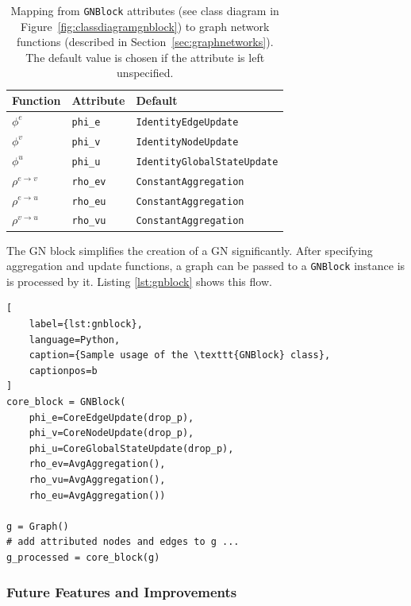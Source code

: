 \begin{table}
    \centering
    \begin{tabular}{ l l l }
        \hline
        \textbf{Function} & \textbf{Attribute} & \textbf{Default}\\
        \hline
        $\phi^e$ & \texttt{phi\_e} & \texttt{IdentityEdgeUpdate} \\
        $\phi^v$ & \texttt{phi\_v} & \texttt{IdentityNodeUpdate} \\
        $\phi^u$ & \texttt{phi\_u} & \texttt{IdentityGlobalStateUpdate} \\
        $\rho^{e\rightarrow v}$ & \texttt{rho\_ev} & \texttt{ConstantAggregation} \\
        $\rho^{e\rightarrow u}$ & \texttt{rho\_eu} & \texttt{ConstantAggregation} \\
        $\rho^{v\rightarrow u}$ & \texttt{rho\_vu} & \texttt{ConstantAggregation} \\
        \hline
    \end{tabular}
    \caption[Mapping from \texttt{GNBlock} attributes to graph network functions]{Mapping from \texttt{GNBlock} attributes (see class diagram in Figure~\ref{fig:classdiagramgnblock}) to graph network functions (described in Section~\ref{sec:graphnetworks}). The default value is chosen if the attribute is left unspecified.}
    \label{tab:gnblockattrs}
\end{table}

The GN block simplifies the creation of a GN significantly. After specifying aggregation and update functions, a graph can be passed to a \texttt{GNBlock} instance is is processed by it. Listing \ref{lst:gnblock} shows this flow.

\begin{lstlisting}[
    label={lst:gnblock},
    language=Python,
    caption={Sample usage of the \texttt{GNBlock} class},
    captionpos=b
]
core_block = GNBlock(
    phi_e=CoreEdgeUpdate(drop_p),
    phi_v=CoreNodeUpdate(drop_p),
    phi_u=CoreGlobalStateUpdate(drop_p),
    rho_ev=AvgAggregation(),
    rho_vu=AvgAggregation(),
    rho_eu=AvgAggregation())

g = Graph()
# add attributed nodes and edges to g ...
g_processed = core_block(g)
\end{lstlisting}

\subsubsection{Future Features and Improvements}

